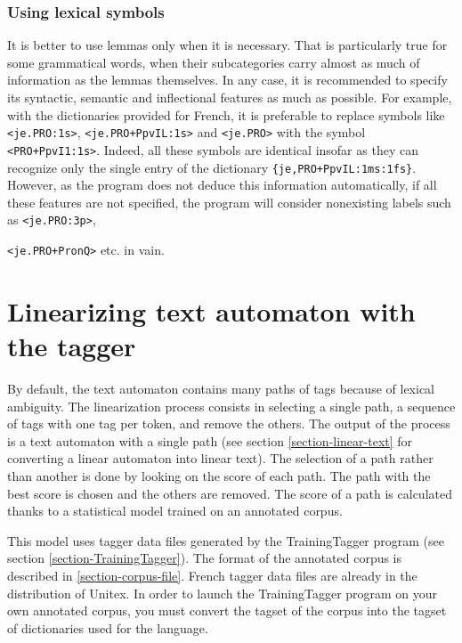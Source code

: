 \subsubsection{Using lexical symbols}

It is better to use lemmas only when it is necessary. That is particularly true
for some grammatical words, when their subcategories carry almost as much of
information as the lemmas themselves. In any case, it is recommended to specify
its syntactic, semantic and inflectional features as much as possible. For
example, with the dictionaries provided for French, it is preferable to replace
symbols like \verb$<je.PRO:1s>$, \verb$<je.PRO+PpvIL:1s>$ and \verb$<je.PRO>$
with the symbol \verb$<PRO+PpvI1:1s>$. Indeed, all these symbols are identical
insofar as they can recognize only the single entry of the dictionary
\verb${je,PRO+PpvIL:1ms:1fs}$. However, as the program does not deduce this
information automatically, if all these features are not specified, the program
will consider nonexisting labels such as \verb$<je.PRO:3p>$, 

\noindent \verb$<je.PRO+PronQ>$ etc. in vain.


\section{Linearizing text automaton with the tagger}
\label{section-linearization}
By default, the text automaton contains many paths of tags because of lexical ambiguity.
The linearization process consists in 
selecting a single path, a sequence of tags with one tag per token, and remove the others. 
The output of the process is a text automaton with a single path (see section \ref{section-linear-text}
for converting a linear automaton into linear text). The selection of a path rather than 
another is done by looking on the score of each path. The path with the best score is chosen 
and the others are removed. The score of a path is calculated thanks to a statistical model trained
on an annotated corpus. 

\bigskip
\noindent This model uses tagger data files generated by the TrainingTagger program 
(see section \ref{section-TrainingTagger}). The format of the annotated corpus is described 
in \ref{section-corpus-file}. French tagger data files are already in the distribution of Unitex.
In order to launch the TrainingTagger program on your own annotated corpus, you must
convert the tagset of the corpus into the tagset of dictionaries used for the language. 

